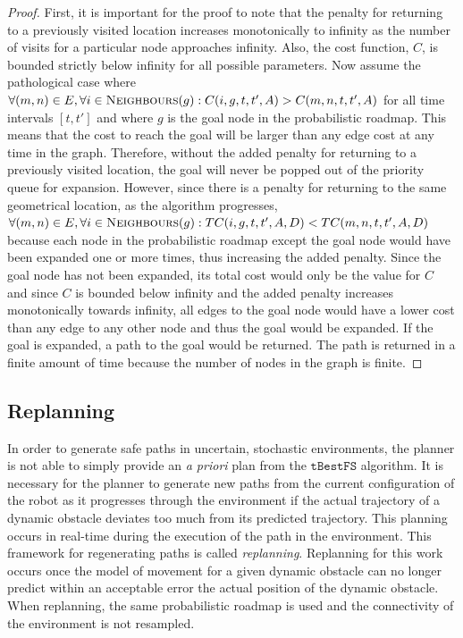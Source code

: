 \documentclass[letterpaper, 10pt, conference]{ieeeconf}
\newcommand{\Acronym}[1]{\ensuremath{{{\texttt{#1}}}}}
\newcommand{\Function}[1]{\ensuremath{{ \textsc{#1}}}}
\begin{document}
\begin{proof}

    First, it is important for the proof to note that the penalty for returning
    to a previously visited location increases monotonically to infinity as the
    number of visits for a particular node approaches infinity. Also, the cost
    function, $C$, is bounded strictly below infinity for all possible
    parameters. Now assume the pathological case where $\forall (m, n)
    \in E, \forall i \in \Function{Neighbours}(g) : C(i, g, t, t', A) > C(m, n,
    t, t', A)$ for all time intervals $[t, t']$ and where $g$ is the goal node
    in the probabilistic roadmap. This means that the cost to reach the goal
    will be larger than any edge cost at any time in the graph.  Therefore,
    without the added penalty for returning to a previously visited location,
    the goal will never be popped out of the priority queue for expansion.
    However, since there is a penalty for returning to the same geometrical
    location, as the algorithm progresses, $\forall (m, n)
    \in E, \forall i \in \Function{Neighbours}(g) : TC(i, g, t, t', A, D) <
    TC(m, n, t, t', A, D)$ because each node in the probabilistic roadmap
    except the goal node would have been expanded one or more times, thus
    increasing the added penalty. Since the goal node has not been expanded,
    its total cost would only be the value for $C$ and since $C$ is bounded
    below infinity and the added penalty increases monotonically towards
    infinity, all edges to the goal node would have a lower cost than any edge
    to any other node and thus the goal would be expanded. If the goal is
    expanded, a path to the goal would be returned. The path is returned in a
    finite amount of time because the number of nodes in the graph is finite.

\end{proof}

\subsection{Replanning}

In order to generate safe paths in uncertain, stochastic environments, the
planner is not able to simply provide an \emph{a priori} plan from the
$\Acronym{tBestFS}$ algorithm. It is necessary for the planner to generate new
paths from the current configuration of the robot as it progresses through the
environment if the actual trajectory of a dynamic obstacle deviates too much
from its predicted trajectory. This planning occurs in real-time during the
execution of the path in the environment. This framework for regenerating paths
is called \emph{replanning}. Replanning for this work occurs once the model of
movement for a given dynamic obstacle can no longer predict within an
acceptable error the actual position of the dynamic obstacle. When replanning,
the same probabilistic roadmap is used and the connectivity of the environment
is not resampled.
\end{document}
